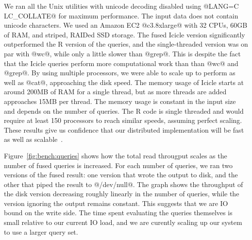 We ran all the Unix utilities with unicode decoding disabled using @LANG=C LC_COLLATE@ for maximum performance. The input data does not contain unicode characters. 
We used an Amazon EC2 @c3.8xlarge@ with 32 CPUs, 60GB of RAM, and striped, RAIDed SSD storage. The fused Icicle version significantly outperformed the R version of the queries, and the single-threaded version was on par with @wc@, while only a little slower than @grep@. This is despite the fact that the Icicle queries perform more computational work than than @wc@ and @grep@. By using multiple processors, we were able to scale up to perform as well as @cat@, approaching the disk speed.
The memory usage of Icicle starts at around 200MB of RAM for a single thread, but as more threads are added approaches 15MB per thread.
The memory usage is constant in the input size and depends on the number of queries.
The R code is single threaded and would require at least 150 processors to reach similar speeds, assuming perfect scaling.
These results give us confidence that our distributed implementation will be fast as well as scalable~\cite{mcsherry2015scalability}.









Figure~\ref{fig:bench:queries} shows how the total read througput scales as the number of fused queries is increased. For each number of queries, we ran two versions of the fused result: one version that wrote the output to disk, and the other that piped the result to @/dev/null@. The graph shows the throughput of the disk version decreasing roughly linearly in the number of queries, while the version ignoring the output remains constant. This suggests that we are IO bound on the write side. The time spent evaluating the queries themselves is small relative to our current IO load, and we are curently scaling up our system to use a larger query set.

